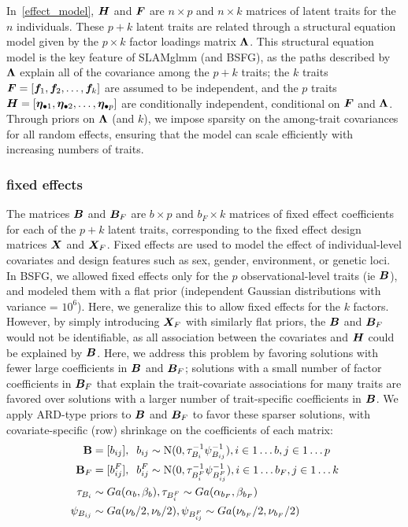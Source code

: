 \documentclass[11pt]{amsart}
\newcommand*{\B}[1]{\ifmmode\bm{#1}\else\textbf{#1}\fi}
\begin{document}
In~\ref{effect_model}, $\B{H}$ and $\B{F}$ are $n \times p$ and $n \times k$ matrices of latent traits for the $n$ individuals. These $p+k$ latent traits are related through a structural equation model given by the $p \times k$ factor loadings matrix $\B{\Lambda}$.  This structural equation model is the key feature of SLAMglmm (and BSFG), as the paths described by $\B{\Lambda}$ explain all of the covariance among the $p + k$ traits; the $k$ traits $\B{F} = [\B{f}_1, \B{f}_2,\dots, \B{f}_k]$ are assumed to be independent, and the $p$ traits $\B{H} = [\B{\eta}_{\bullet 1}, \B{\eta}_{\bullet 2},\dots,\B{\eta}_{\bullet p}]$ are conditionally independent, conditional on $\B{F}$ and $\B{\Lambda}$. Through priors on $\B{\Lambda}$ (and $k$), we impose sparsity on the among-trait covariances for all random effects, ensuring that the model can scale efficiently with increasing numbers of traits.

\subsubsection{fixed effects}
The matrices $\B{B}$ and $\B{B}_F$ are $b \times p$ and $b_F \times k$ matrices of fixed effect coefficients for each of the $p + k$ latent traits, corresponding to the fixed effect design matrices $\B{X}$ and $\B{X}_F$. Fixed effects are used to model the effect of individual-level covariates and design features such as sex, gender, environment, or genetic loci. In BSFG, we allowed fixed effects only for the $p$ observational-level traits (ie $\B{B}$), and modeled them with a flat prior (independent Gaussian distributions with variance = $10^6$). Here, we generalize this to allow fixed effects for the $k$ factors. However, by simply introducing $\B{X}_F$ with similarly flat priors, the $\B{B}$ and $\B{B}_F$ would not be identifiable, as all association between the covariates and $\B{H}$ could be explained by $\B{B}$. Here, we address this problem by favoring solutions with fewer large coefficients in $\B{B}$ and $\B{B}_F$; solutions with a small number of factor coefficients in $\B{B}_F$ that explain the trait-covariate associations for many traits are favored over solutions with a larger number of trait-specific coefficients in $\B{B}$. We apply ARD-type priors to $\B{B}$ and $\B{B}_F$ to favor these sparser solutions, with covariate-specific (row) shrinkage on the coefficients of each matrix:
\begin{align}\begin{split}
\B{B} &= [b_{ij}],\;\; b_{ij} \sim \mbox{N}(0,\tau^{-1}_{B_i} \psi^{-1}_{B_{ij}}), i \in 1\dots b, j \in 1\dots p \\
\B{B}_F &= [b^F_{ij}],\;\; b^F_{ij} \sim \mbox{N}(0,\tau^{-1}_{B^F_i} \psi^{-1}_{B^F_{ij}}), i \in 1\dots b_F, j \in 1\dots k\\
\tau_{B_i} &\sim Ga(\alpha_b, \beta_b), \tau_{B^F_i} \sim Ga(\alpha_{b_F}, \beta_{b_F}) \\
\psi_{B_{ij}} &\sim Ga(\nu_b/2, \nu_b/2), \psi_{B^F_{ij}} \sim Ga(\nu_{b_F}/2, \nu_{b_F}/2)
\end{split} \end{align}
\end{document}
